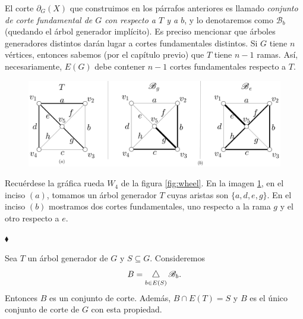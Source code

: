 El corte $\partial_{G}(X)$ que construimos en los párrafos anteriores es llamado \textit{conjunto de corte fundamental de $G$ con respecto a $T$ y a $b$}, y lo denotaremos como $\mathscr{B}_{b}$ (quedando el árbol generador implícito). Es preciso mencionar que árboles generadores distintos darán lugar a cortes fundamentales distintos. Si $G$ tiene $n$ vértices, entonces sabemos (por el capítulo previo) que $T$ tiene $n-1$ ramas. Así,  necesariamente, $E(G)$ debe contener $n-1$ cortes fundamentales respecto a $T$.  

\begin{ejem} \label{ejem:cortesfundamentales}
\begin{figure}[H]
\vspace{-1.5cm}
    \centering
    \includegraphics[scale = 0.18]{img/imgchapter2/bondminimales.jpg}
    \caption{}
    \label{fig:bondminimales}
\end{figure}


Recuérdese la gráfica rueda $W_{4}$ de la figura \ref{fig:wheel}. En la imagen \ref{fig:bondminimales}, en el inciso $(a)$, tomamos un árbol generador $T$ cuyas aristas son $\{a, d, e, g\}$. En el inciso $(b)$ mostramos dos cortes fundamentales, uno respecto a la rama $g$ y el otro respecto a $e$.


\hfill $\blacklozenge$
\end{ejem}



\begin{lema}\label{cortesfundamentalespropchida}
Sea $T$ un árbol generador de $G$ y $S\subseteq G$. Consideremos  
$$
B =\difsym_{b \in E(S)} \mathscr{B}_{b}. 
$$
Entonces $B$ es un conjunto de corte. Además, $B \cap E(T) = S$ y $B$ es el único conjunto de corte de $G$ con esta propiedad.
\end{lema}

